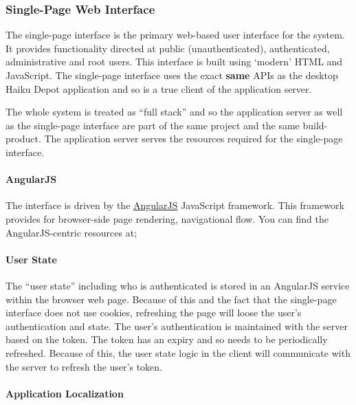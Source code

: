 \subsubsection{Single-Page Web Interface}

The single-page interface is the primary web-based user interface for the system.  It provides functionality directed at public (unauthenticated), authenticated, administrative and root users.  This interface is built using `modern' HTML and JavaScript.  The single-page interface uses the exact {\bf same} APIs as the desktop Haiku Depot application and so is a true client of the application server.

The whole system is treated as ``full stack'' and so the application server as well as the single-page interface are part of the same project and the same build-product.  The application server serves the resources required for the single-page interface.

\paragraph{AngularJS}

The interface is driven by the \href{https://angularjs.org/}{AngularJS} JavaScript framework.  This framework provides for browser-side page rendering, navigational flow.  You can find the AngularJS-centric resources at;


\paragraph{User State}

The ``user state'' including who is authenticated is stored in an AngularJS service within the browser web page.  Because of this and the fact that the single-page interface does not use cookies, refreshing the page will loose the user's authentication and state.  The user's authentication is maintained with the server based on the token.  The token has an expiry and so needs to be periodically refreshed.  Because of this, the user state logic in the client will communicate with the server to refresh the user's token.

\paragraph{Application Localization}

